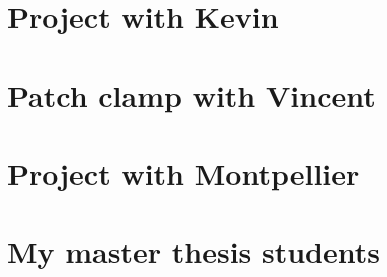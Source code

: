 \section{Project with Kevin}
\section{Patch clamp with Vincent}
\section{Project with Montpellier}
\section{My master thesis students}

